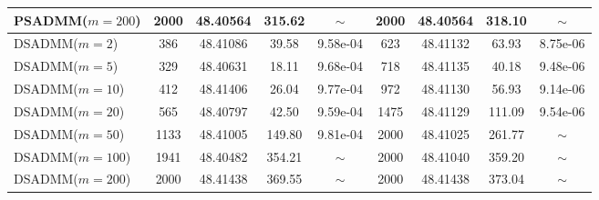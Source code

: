 \documentclass{mcom-l}
\theoremstyle{definition}
\theoremstyle{remark}
\numberwithin{equation}{section}
\begin{document}
\begin{center}
{\begin{tabular}{|l|| c| c| c| c|| c| c| c| c|}
PSADMM($m=  200$)   & 2000  & 48.40564 & 315.62        & $\sim$    & 2000  & 48.40564 & 318.10    & $\sim$\\%
\hline
DSADMM($m=    2$)   &  386  & 48.41086 & 39.58         & 9.58e-04  &  623  & 48.41132 & 63.93     & 8.75e-06\\
DSADMM($m=    5$)   &  329  & 48.40631 & 18.11         & 9.68e-04  &  718  & 48.41135 & 40.18     & 9.48e-06\\
DSADMM($m=   10$)   &  412  & 48.41406 & 26.04         & 9.77e-04  &  972  & 48.41130 & 56.93     & 9.14e-06\\
DSADMM($m=   20$)   &  565  & 48.40797 & 42.50         & 9.59e-04  & 1475  & 48.41129 & 111.09    & 9.54e-06\\
DSADMM($m=   50$)   & 1133  & 48.41005 & 149.80        & 9.81e-04  & 2000  & 48.41025 & 261.77    & $\sim$\\%
DSADMM($m=  100$)   & 1941  & 48.40482 & 354.21        & $\sim$    & 2000  & 48.41040 & 359.20    & $\sim$\\%
DSADMM($m=  200$)   & 2000  & 48.41438 & 369.55        & $\sim$    & 2000  & 48.41438 & 373.04    & $\sim$\\%
\hline
\end{tabular}
}
\end{center}
\end{document}
